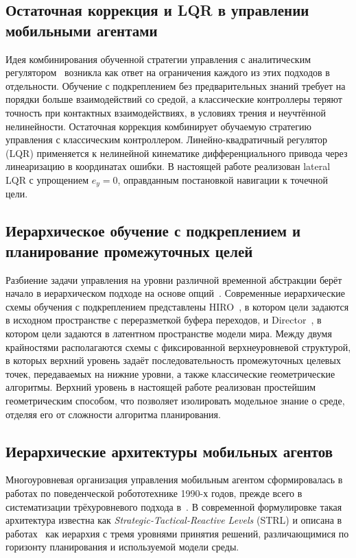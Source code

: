 \documentclass[11pt]{article}
\begin{document}
\subsection{Остаточная коррекция и LQR в управлении мобильными агентами}
\label{sec:rw_residual}

Идея комбинирования обученной стратегии управления с аналитическим регулятором~\cite{silver2018residual,johannink2019residual} возникла как ответ на ограничения каждого из этих подходов в отдельности. Обучение с подкреплением без предварительных знаний требует на порядки больше взаимодействий со средой, а классические контроллеры теряют точность при контактных взаимодействиях, в условиях трения и неучтённой нелинейности.
Остаточная коррекция комбинирует обучаемую стратегию управления с классическим контроллером.
Линейно-квадратичный регулятор (LQR) применяется к нелинейной кинематике
дифференциального привода через линеаризацию в координатах ошибки. В настоящей работе реализован lateral LQR с упрощением $e_y = 0$,
оправданным постановкой навигации к точечной цели.

\subsection{Иерархическое обучение с подкреплением и планирование промежуточных целей}
\label{sec:rw_hrl}

Разбиение задачи управления на уровни различной временной абстракции берёт начало в иерархическом подходе на основе опций~\cite{sutton1999options}. Современные иерархические схемы обучения с подкреплением представлены
HIRO~\cite{nachum2018hiro}, в котором цели задаются в исходном пространстве
с переразметкой буфера переходов, и Director~\cite{hafner2022director},
в котором цели задаются в латентном пространстве модели мира. Между двумя крайностями располагаются схемы с фиксированной верхнеуровневой структурой, в которых верхний уровень задаёт последовательность промежуточных целевых точек, передаваемых на нижние уровни, а также классические геометрические алгоритмы.
Верхний уровень в настоящей работе реализован простейшим
геометрическим способом, что позволяет изолировать модельное знание о среде, отделяя его от сложности алгоритма планирования.


\subsection{Иерархические архитектуры мобильных агентов}
\label{sec:rw_strl}

Многоуровневая организация управления мобильным агентом сформировалась в работах по поведенческой робототехнике 1990-х годов, прежде всего в систематизации трёхуровневого подхода в~\cite{gat1998three}. В современной формулировке такая архитектура известна как \emph{Strategic-Tactical-Reactive Levels} (STRL) и описана в работах~\cite{kiselev2020dissertation,kiselev2020} как иерархия с тремя уровнями принятия решений, различающимися по горизонту планирования и используемой модели среды.
\end{document}
